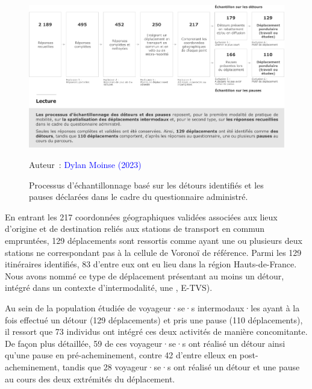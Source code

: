 \begin{refsegment}
    \begin{figure}[h!]\vspace*{4pt}
        \caption{Processus d'échantillonnage basé sur les détours identifiés et les pauses déclarées dans le cadre du questionnaire administré.}
        \label{fig-chap5:echantillonnage-detours-pauses}
        \centerline{\includegraphics[width=1\columnwidth]{src/Figures/Chap-5/FR_Detours_Echantillonnage.pdf}}
        \vspace{5pt}
        \begin{flushright}\scriptsize{
        Auteur~: \textcolor{blue}{Dylan Moinse (2023)}
        }\end{flushright}
    \end{figure}

En entrant les 217 coordonnées géographiques validées associées aux lieux d'origine et de destination reliés aux stations de transport en commun empruntées, 129 déplacements sont ressortis comme ayant une ou plusieurs deux stations ne correspondant pas à la cellule de Voronoï de référence. Parmi les 129 itinéraires identifiés, 83 d'entre eux ont eu lieu dans la région Hauts-de-France. Nous avons nommé ce type de déplacement présentant au moins un détour, intégré dans un contexte d'\gls{intermodalité}, une , \acrfull{E-TVS}).%

Au sein de la population étudiée de voyageur·se·s intermodaux·les ayant à la fois effectué un détour (129 déplacements) et pris une pause (110 déplacements), il ressort que 73 individus ont intégré ces deux activités de manière concomitante. De façon plus détaillée, 59 de ces voyageur·se·s ont réalisé un détour ainsi qu'une pause en pré-acheminement, contre 42 d'entre elleux en post-acheminement, tandis que 28 voyageur·se·s ont réalisé un détour et une pause au cours des deux extrémités du déplacement.%


\end{refsegment}

